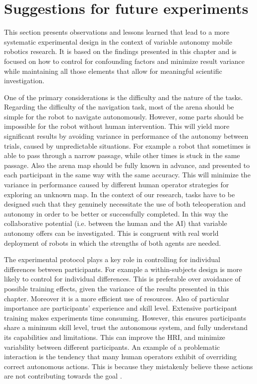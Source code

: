 \documentclass[a4paper,12pt,oneside,openright]{bhamthesis}
\begin{document}
\section{Suggestions for future experiments}
\label{chap3:guidelines}
This section presents observations and lessons learned that lead to a more systematic experimental design in the context of variable autonomy mobile robotics research. It is based on the findings presented in this chapter and is focused on how to control for confounding factors and minimize result variance while maintaining all those elements that allow for meaningful scientific investigation.

One of the primary considerations is the difficulty and the nature of the tasks. Regarding the difficulty of the navigation task, most of the arena should be simple for the robot to navigate autonomously. However, some parts should be impossible for the robot without human intervention. This will yield more significant results by avoiding variance in performance of the autonomy between trials, caused by unpredictable situations. For example a robot that sometimes is able to pass through a narrow passage, while other times is stuck in the same passage. Also the arena map should be fully known in advance, and presented to each participant in the same way with the same accuracy. This will minimize the variance in performance caused by different human operator strategies for exploring an unknown map. In the context of our research, tasks have to be designed such that they genuinely necessitate the use of both teleoperation and autonomy in order to be better or successfully completed. In this way the collaborative potential (i.e. between the human and the AI) that variable autonomy offers can be investigated. This is congruent with real world deployment of robots in which the strengths of both agents are needed.

The experimental protocol plays a key role in controlling for individual differences between participants. For example a within-subjects design is more likely to control for individual differences. This is preferable over avoidance of possible training effects, given the variance of the results presented in this chapter. Moreover it is a more efficient use of resources. Also of particular importance are participants' experience and skill level. Extensive participant training makes experiments time consuming. However, this ensures participants share a minimum skill level, trust the autonomous system, and fully understand its capabilities and limitations. This can improve the HRI, and minimize variability between different participants. An example of a problematic interaction is the tendency that many human operators exhibit of overriding correct autonomous actions. This is because they mistakenly believe these actions are not contributing towards the goal \citep{Marble2004}.
\end{document}
